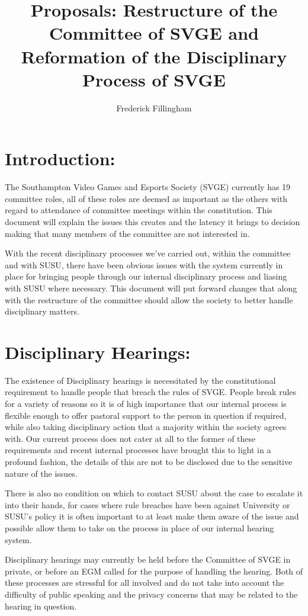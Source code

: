 \documentclass[10pt, a4paper]{article}
\title{Proposals: Restructure of the Committee of SVGE and Reformation of the Disciplinary Process of SVGE}
\author{Frederick Fillingham}
\begin{document}
\maketitle

\section{Introduction:}
The Southampton Video Games and Esports Society (SVGE) currently has 19 committee roles, all of these roles are deemed as important as the others with regard to attendance of committee meetings within the constitution. This document will explain the issues this creates and the latency it brings to decision making that many members of the committee are not interested in.

With the recent disciplinary processes we've carried out, within the committee and with SUSU, there have been obvious issues with the system currently in place for bringing people through our internal disciplinary process and liasing with SUSU where necessary. This document will put forward changes that along with the restructure of the committee should allow the society to better handle disciplinary matters.

\section{Disciplinary Hearings:}
The existence of Disciplinary hearings is necessitated by the constitutional requirement to handle people that breach the rules of SVGE. People break rules for a variety of reasons so it is of high importance that our internal process is flexible enough to offer pastoral support to the person in question if required, while also taking disciplinary action that a majority within the society agrees with. Our current process does not cater at all to the former of these requirements and recent internal processes have brought this to light in a profound fashion, the details of this are not to be disclosed due to the sensitive nature of the issues.

There is also no condition on which to contact SUSU about the case to escalate it into their hands, for cases where rule breaches have been against University or SUSU's policy it is often important to at least make them aware of the issue and possible allow them to take on the process in place of our internal hearing system.

Disciplinary hearings may currently be held before the Committee of SVGE in private, or before an EGM called for the purpose of handling the hearing. Both of these processes are stressful for all involved and do not take into account the difficulty of public speaking and the privacy concerns that may be related to the hearing in question.
\end{document}
